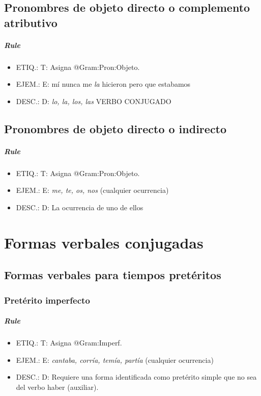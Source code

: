 \documentclass[11pt]{report}
\begin{document}
\section{Pronombres de objeto directo o complemento atributivo}
\paragraph*{Rule}
\begin{itemize}
\item ETIQ.:  T: Asigna @Gram:Pron:Objeto.
\item EJEM.:  E: mí nunca me \emph{la} hicieron pero que estabamos
\item DESC.:  D: \emph{lo, la, los, las} VERBO CONJUGADO
\end{itemize}

\section{Pronombres de objeto directo o indirecto}
\paragraph*{Rule}
\begin{itemize}
\item ETIQ.:  T: Asigna @Gram:Pron:Objeto.
\item EJEM.:  E: \emph{me, te, os, nos} (cualquier ocurrencia)
\item DESC.:  D: La ocurrencia de uno de ellos
\end{itemize}

\chapter{Formas verbales conjugadas}
\section{Formas verbales para tiempos pretéritos}
\subsection{Pretérito imperfecto}
\paragraph*{Rule}
\begin{itemize}
\item ETIQ.:  T: Asigna @Gram:Imperf.
\item EJEM.:  E: \emph{cantaba, corría, temía, partía} (cualquier ocurrencia)
\item DESC.:  D: Requiere una forma identificada como pretérito simple que no sea del verbo haber (auxiliar).
\end{itemize}
\end{document}
